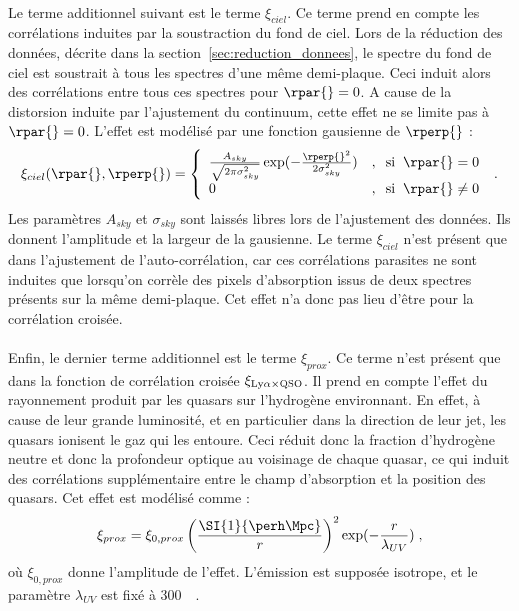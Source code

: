 \paragraph{}
Le terme additionnel suivant est le terme $\xi_{ciel}$. Ce terme prend en compte les corrélations induites par la soustraction du fond de ciel. Lors de la réduction des données, décrite dans la section~\ref{sec:reduction_donnees}, le spectre du fond de ciel est soustrait à tous les spectres d'une même demi-plaque. Ceci induit alors des corrélations entre tous ces spectres pour $\rpar{} = 0$. A cause de la distorsion induite par l'ajustement du continuum, cette effet ne se limite pas à $\rpar{} = 0$.
L'effet est modélisé par une fonction gausienne de $\rperp{}$ :
\begin{equation}
  \xi_{ciel}(\rpar{}, \rperp{}) =
  \left\{
    \begin{array}{ll}
      \frac{A_{sky}}{\sqrt{2 \pi \sigma_{sky}^{2}}} \exp(- \frac{\rperp{}^2}{2 \sigma_{sky}^2}) & , \hspace{0.2cm} \mathrm{si} \hspace{0.2cm} \rpar{} = 0 \\
      0 & ,  \hspace{0.2cm} \mathrm{si} \hspace{0.2cm}  \rpar{} \neq 0
    \end{array}
\right.  \; .
\end{equation}
Les paramètres $A_{sky}$ et $\sigma_{sky}$ sont laissés libres lors de l'ajustement des données. Ils donnent l'amplitude et la largeur de la gausienne.
Le terme $\xi_{ciel}$ n'est présent que dans l'ajustement de l'auto-corrélation, car ces corrélations parasites ne sont induites que lorsqu'on corrèle des pixels d'absorption issus de deux spectres présents sur la même demi-plaque. Cet effet n'a donc pas lieu d'être pour la corrélation croisée.

\paragraph{}
Enfin, le dernier terme additionnel est le terme $\xi_{prox}$. Ce terme n'est présent que dans la fonction de corrélation croisée $\xi_{\mathrm{Ly}\alpha\times\textsc{QSO}}$. Il prend en compte l'effet du rayonnement produit par les quasars sur l'hydrogène environnant. En effet, à cause de leur grande luminosité, et en particulier dans la direction de leur jet, les quasars ionisent le gaz qui les entoure. Ceci réduit donc la fraction d'hydrogène neutre et donc la profondeur optique au voisinage de chaque quasar, ce qui induit des corrélations supplémentaire entre le champ d'absorption \lya{} et la position des quasars. Cet effet est modélisé comme \autocite{Font-Ribera2013} :
\begin{equation}
  \xi_{prox} = \xi_{0,prox} \left(\frac{\SI{1}{\perh\Mpc}}{r} \right)^2 \exp( - \frac{r}{\lambda_{UV}}) \; ,
\end{equation}
où $\xi_{0,prox}$ donne l'amplitude de l'effet. L'émission est supposée isotrope, et le paramètre $\lambda_{UV}$ est fixé à \SI{300}{\perh\Mpc}.


